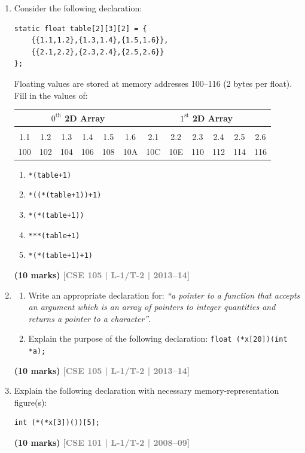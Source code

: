 \documentclass[12pt,a3paper]{article}
\newcommand{\yr}[1]{\hfill\textcolor{gray}{\small\textbf{[#1]}}}
\newcommand{\mk}[1]{\textcolor{orange!70!black}{\small\textbf{(#1 marks)}}}
\begin{document}
\begin{enumerate}
\item Consider the following declaration:
\begin{lstlisting}
static float table[2][3][2] = {
    {{1.1,1.2},{1.3,1.4},{1.5,1.6}},
    {{2.1,2.2},{2.3,2.4},{2.5,2.6}}
};
\end{lstlisting}
Floating values are stored at memory addresses 100--116 (2 bytes per float). Fill in the values of:
\begin{center}
  \begin{tabular}{|c|c|c|c|c|c|c|c|c|c|c|c|}
\hline
\multicolumn{6}{|c|}{$0^{\text{th}}$ 2D Array} & \multicolumn{6}{c|}{$1^{\text{st}}$ 2D Array} \\ \hline
& & & & & & & & & & & \\
1.1 & 1.2 & 1.3 & 1.4 & 1.5 & 1.6 & 2.1 & 2.2 & 2.3 & 2.4 & 2.5 & 2.6 \\ 
\hline
\multicolumn{1}{c}{100} & \multicolumn{1}{c}{102} & \multicolumn{1}{c}{104} & \multicolumn{1}{c}{106} & \multicolumn{1}{c}{108} & \multicolumn{1}{c}{10A} & \multicolumn{1}{c}{10C} & \multicolumn{1}{c}{10E} & \multicolumn{1}{c}{110} & \multicolumn{1}{c}{112} & \multicolumn{1}{c}{114} & \multicolumn{1}{c}{116}
\end{tabular}
\end{center}

\begin{enumerate}
  \item \texttt{*(table+1)}
  \item \texttt{*((*(table+1))+1)}
  \item \texttt{*(*(table+1))}
  \item \texttt{***(table+1)}
  \item \texttt{*(*(table+1)+1)}
\end{enumerate}
\mk{10} \yr{CSE 105 | L-1/T-2 | 2013--14}

\item
\begin{enumerate}
  \item Write an appropriate declaration for: \textit{``a pointer to a function that accepts an argument which is an array of pointers to integer quantities and returns a pointer to a character''}.
  \item Explain the purpose of the following declaration: \texttt{float (*x[20])(int *a);}
\end{enumerate}
\mk{10} \yr{CSE 105 | L-1/T-2 | 2013--14}

\item Explain the following declaration with necessary memory-representation figure(s):
\begin{lstlisting}
int (*(*x[3])())[5];
\end{lstlisting}
\mk{10} \yr{CSE 101 | L-1/T-2 | 2008--09}


\end{enumerate}
\end{document}
